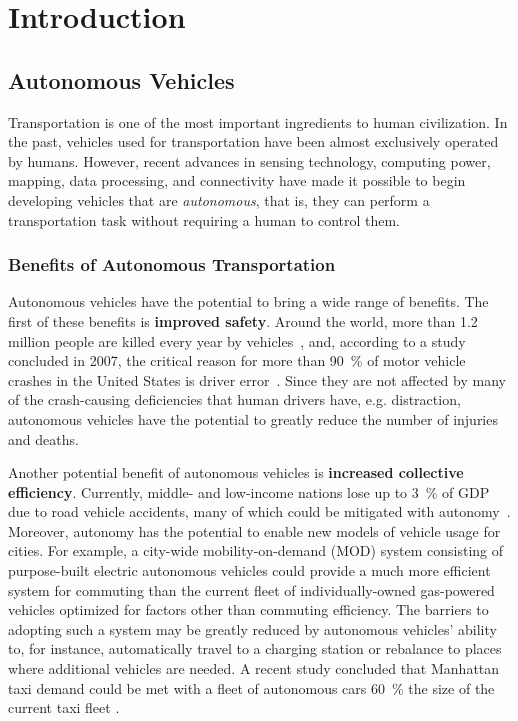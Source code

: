 \chapter{Introduction}

\section{Autonomous Vehicles}

Transportation is one of the most important ingredients to human civilization.
In the past, vehicles used for transportation have been almost exclusively operated by humans.
However, recent advances in sensing technology, computing power, mapping, data processing, and connectivity have made it possible to begin developing vehicles that are \emph{autonomous}, that is, they can perform a transportation task without requiring a human to control them.

\subsection{Benefits of Autonomous Transportation} \label{sec:benefits}

Autonomous vehicles have the potential to bring a wide range of benefits.
The first of these benefits is \textbf{improved safety}.
Around the world, more than 1.2 million people are killed every year by vehicles~\cite{who2015global}, and, according to a study concluded in 2007, the critical reason for more than \SI{90}{\percent} of motor vehicle crashes in the United States is driver error~\cite{nhtsa2015critical}.
Since they are not affected by many of the crash-causing deficiencies that human drivers have, e.g. distraction, autonomous vehicles have the potential to greatly reduce the number of injuries and deaths.

Another potential benefit of autonomous vehicles is \textbf{increased collective efficiency}.
Currently, middle- and low-income nations lose up to \SI{3}{\percent} of GDP due to road vehicle accidents, many of which could be mitigated with autonomy~\cite{who2015global}.
Moreover, autonomy has the potential to enable new models of vehicle usage for cities.
For example, a city-wide mobility-on-demand (MOD) system consisting of purpose-built electric autonomous vehicles could provide a much more efficient system for commuting than the current fleet of individually-owned gas-powered vehicles optimized for factors other than commuting efficiency.
The barriers to adopting such a system may be greatly reduced by autonomous vehicles' ability to, for instance, automatically travel to a charging station or rebalance to places where additional vehicles are needed.
A recent study concluded that Manhattan taxi demand could be met with a fleet of autonomous cars \SI{60}{\percent} the size of the current taxi fleet \cite{RZ-MP:15_MODa}.


